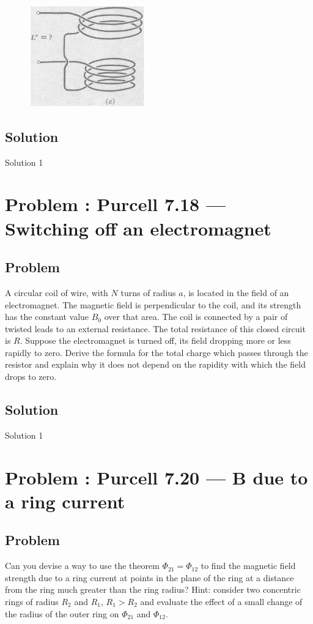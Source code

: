 \documentclass[solutions]{esg8022pset}
\begin{document}
  \begin{figure}[H]
    \centering
    \includegraphics[width = 5cm]{pu711c}
    \label{fig:crossbar}
  \end{figure}


\subsection{Solution}
  Solution 1
\section{Problem \thesection: Purcell 7.18 --- Switching off an electromagnet}
\subsection{Problem}
A circular coil of wire, with $N$ turns of radius $a$, is located in the field of an electromagnet.
The magnetic field is perpendicular to the coil, and its strength has the constant value $B_{0}$ over that area.
The coil is connected by a pair of twisted leads to an external resistance. The total resistance of this closed
 circuit is $R$. Suppose the electromagnet is turned off, its field dropping more or less rapidly to zero. Derive
  the formula for the total charge which passes through the resistor and explain why it does not depend on the rapidity
  with which the field drops to zero.
\subsection{Solution}
  Solution 1
\section{Problem \thesection: Purcell 7.20 --- B due to a ring current}
\subsection{Problem}
Can you devise a way to use the theorem $\Phi_{21}=\Phi_{12}$ to find the magnetic
 field strength due to a ring current at points in the plane of the ring at a distance from the ring much greater than the ring radius?
 Hint: consider two concentric rings of radius $R_{2}$ and $R_{1}$, $R_{1}>R_{2}$ and evaluate the effect of a small change
  of the radius of the outer ring on $\Phi_{21}$ and $\Phi_{12}$.
\end{document}
